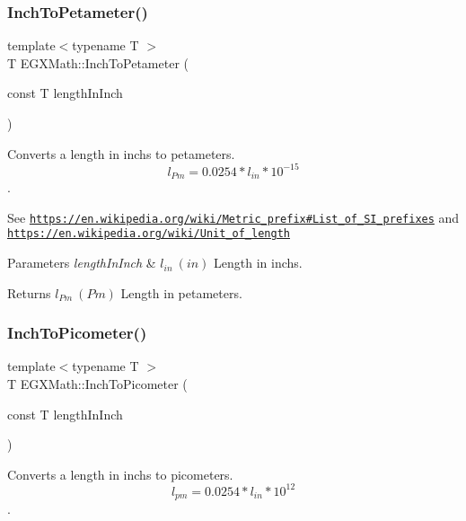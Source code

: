 \subsubsection{\texorpdfstring{Inch\+To\+Petameter()}{InchToPetameter()}}
{\footnotesize\ttfamily template$<$typename T $>$ \\
T E\+G\+X\+Math\+::\+Inch\+To\+Petameter (\begin{DoxyParamCaption}\item[{const T}]{length\+In\+Inch }\end{DoxyParamCaption})}



Converts a length in inchs to petameters. \[ l_{Pm}=0.0254 * l_{in} * 10^{-15} \]. 

See \href{https://en.wikipedia.org/wiki/Metric_prefix#List_of_SI_prefixes}{\tt https\+://en.\+wikipedia.\+org/wiki/\+Metric\+\_\+prefix\#\+List\+\_\+of\+\_\+\+S\+I\+\_\+prefixes} and \href{https://en.wikipedia.org/wiki/Unit_of_length}{\tt https\+://en.\+wikipedia.\+org/wiki/\+Unit\+\_\+of\+\_\+length} 
\begin{DoxyParams}{Parameters}
{\em length\+In\+Inch} & $ l_{in}\ (in)$ Length in inchs. \\
\hline
\end{DoxyParams}
\begin{DoxyReturn}{Returns}
$ l_{Pm}\ (Pm)$ Length in petameters. 
\end{DoxyReturn}
\mbox{\label{group___e_g_x_math-_conversions-_length_conversions-_imperial-_inch-_s_i_ga4220728877d0369e359689a0d8f8207c}} 
\subsubsection{\texorpdfstring{Inch\+To\+Picometer()}{InchToPicometer()}}
{\footnotesize\ttfamily template$<$typename T $>$ \\
T E\+G\+X\+Math\+::\+Inch\+To\+Picometer (\begin{DoxyParamCaption}\item[{const T}]{length\+In\+Inch }\end{DoxyParamCaption})}



Converts a length in inchs to picometers. \[ l_{pm}=0.0254 * l_{in} * 10^{12} \]. 


